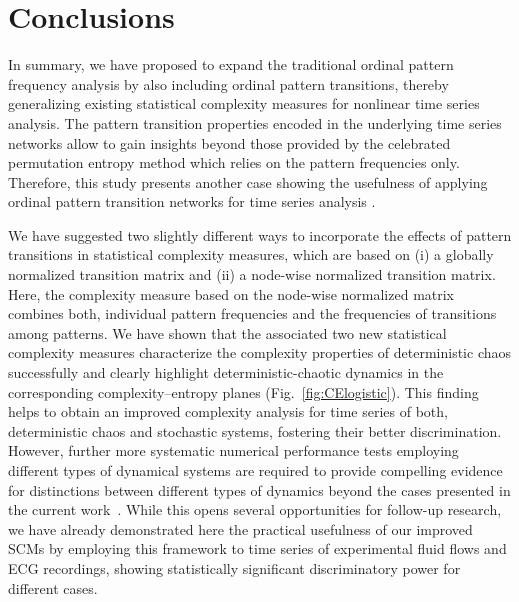 \documentclass[aip,cha,reprint,nofootinbib]{revtex4-1}
\begin{document}
\section{Conclusions} \label{sec:con}
In summary, we have proposed to expand the traditional ordinal pattern frequency analysis by also including ordinal pattern transitions, thereby generalizing existing statistical complexity measures for nonlinear time series analysis. The pattern transition properties encoded in the underlying time series networks allow to gain insights beyond those provided by the celebrated permutation entropy method which relies on the pattern frequencies only. Therefore, this study presents another case showing the usefulness of applying ordinal pattern transition networks for time series analysis \cite{ZouPR2018}. 

We have suggested two slightly different ways to incorporate the effects of pattern transitions in statistical complexity measures, which are based on (i) a globally normalized transition matrix and (ii) a node-wise normalized transition matrix. Here, the complexity measure based on the node-wise normalized matrix combines both, individual pattern frequencies and the frequencies of transitions among patterns. We have shown that the associated two new statistical complexity measures characterize the complexity properties of deterministic chaos successfully and clearly highlight deterministic-chaotic dynamics in the corresponding complexity--entropy planes (Fig.~\ref{fig:CElogistic}). This finding helps to obtain an improved complexity analysis for time series of both, deterministic chaos and stochastic systems, fostering their better discrimination. However, further more systematic numerical performance tests employing different types of dynamical systems are required to provide compelling evidence for distinctions between different types of dynamics beyond the cases presented in the current work~\cite{BorgesAMC2019,RossoPRE2007}. While this opens several opportunities for follow-up research, we have already demonstrated here the practical usefulness of our improved SCMs by employing this framework to time series of experimental fluid flows and ECG recordings, showing {\color{red} statistically significant discriminatory power} for different cases. 
\end{document}
